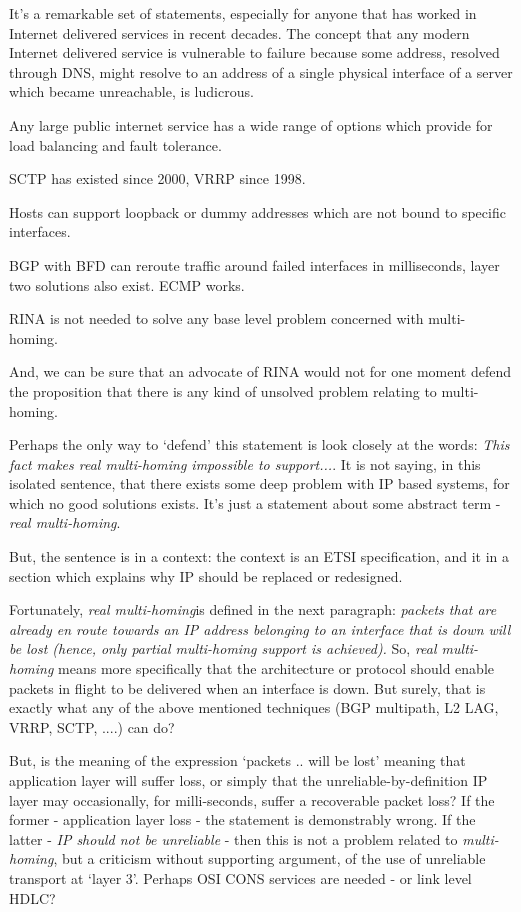 It's a remarkable set of statements, especially for anyone that has worked in Internet delivered services in recent decades.
The concept that any modern Internet delivered service is vulnerable to failure because some address, resolved through DNS, might resolve to an address of a single physical interface of a server which became unreachable, is ludicrous.

Any large public internet service has a wide range of options which provide for load balancing and fault tolerance.

SCTP has existed since 2000, VRRP since 1998.

Hosts can support loopback or dummy addresses which are not bound to specific interfaces.

BGP with BFD can reroute traffic around failed interfaces in milliseconds, layer two solutions also exist.  ECMP works.

RINA is not needed to solve any base level problem concerned with multi-homing.

And, we can be sure that an advocate of RINA would not for one moment defend the proposition that there is any kind of unsolved problem relating to multi-homing.

Perhaps the only way to `defend' this statement is look closely at the words:  \emph{This fact makes real multi-homing impossible to support...}.
It is not saying, in this isolated sentence, that there exists some deep problem with IP based systems, for which no good solutions exists.  It's just a statement about some abstract term - \emph{real multi-homing}.

But, the sentence is in a context: the context is an ETSI specification, and it in a section which explains why IP should be replaced or redesigned.

Fortunately, \emph{real multi-homing}is defined in the next paragraph: \emph{packets that are already en route towards an IP address belonging to an interface that is down will be lost (hence, only partial multi-homing support is achieved).}  So, \emph{real multi-homing} means more specifically that the architecture or protocol should enable packets in flight to be delivered when an interface is down.  But surely, that is exactly what any of the above mentioned techniques (BGP multipath, L2 LAG, VRRP, SCTP, ....) can do?

But, is the meaning of the expression `packets .. will be lost' meaning that application layer will suffer loss, or simply that the unreliable-by-definition IP layer may occasionally, for milli-seconds, suffer a recoverable packet loss?
If the former - application layer loss - the statement is demonstrably wrong.
If the latter - \emph{IP should not be unreliable} - then this is not a problem related to \emph{multi-homing}, but a criticism without supporting argument, of the use of unreliable transport at `layer 3'.
Perhaps OSI CONS services are needed - or link level HDLC?

